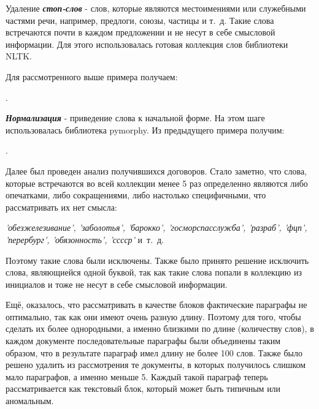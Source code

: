 \documentclass[12pt]{article}
\begin{document}
 \vspace{13pt}

Удаление \textbf{\textit{стоп-слов}} - слов, которые являются местоимениями или служебными частями речи, например, предлоги, союзы, частицы и т.~д. Такие слова встречаются почти в каждом предложении и не несут в себе смысловой информации. Для этого использовалась готовая коллекция слов библиотеки NLTK. 

Для рассмотренного выше примера получаем:

\vspace{13pt}
.
\vspace{13pt}

\textbf{\textit{Нормализация}} - приведение слова к начальной форме. На этом шаге использовалась библиотека pymorphy. Из предыдущего примера получим:

\vspace{13pt}
.
\vspace{13pt}

Далее был проведен анализ получившихся договоров. Стало заметно, что слова, которые встречаются во всей коллекции менее 5 раз определенно являются либо опечатками, либо сокращениями, либо настолько специфичными, что рассматривать их нет смысла: 

\vspace{10pt}
\noindent\textit{'обезжелезивание', 'заболотья', 'барокко', 'госморспасслужба', \linebreak 'разраб', 'фцп', 'перербург', 'обязонность', 'сссср'} и~т.~д.
\vspace{10pt}

Поэтому такие слова были исключены. Также было принято решение исключить слова, являющиейся одной буквой, так как такие слова попали в коллекцию из инициалов и тоже не несут в себе смысловой информации.

Ещё, оказалось, что рассматривать в качестве блоков фактические параграфы не оптимально, так как они имеют очень разную длину. Поэтому для того, чтобы сделать их более однородными, а именно близкими по длине (количеству слов), в каждом документе последовательные параграфы были объединены таким образом, что в результате параграф имел длину не более 100 слов. Также было решено удалить из рассмотрения те документы, в которых получилось слишком мало параграфов, а именно меньше 5. Каждый такой параграф теперь рассматривается как текстовый блок, который может быть типичным или аномальным. 
\end{document}
